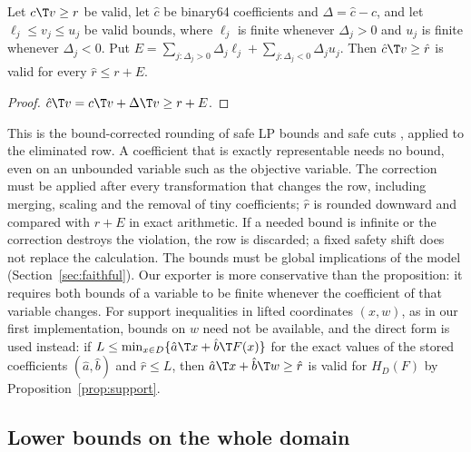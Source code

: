 \begin{proposition}\label{prop:export}
Let $c\T v\ge r$ be valid, let $\hat c$ be binary64 coefficients and
$\Delta=\hat c-c$, and let $\ell_j\le v_j\le u_j$ be valid bounds, where
$\ell_j$ is finite whenever $\Delta_j>0$ and $u_j$ is finite whenever
$\Delta_j<0$. Put
$E=\sum_{j:\Delta_j>0}\Delta_j\ell_j+\sum_{j:\Delta_j<0}\Delta_ju_j$. Then
$\hat c\T v\ge\hat r$ is valid for every $\hat r\le r+E$.
\end{proposition}

\begin{proof}
$\hat c\T v=c\T v+\Delta\T v\ge r+E$.
\end{proof}

This is the bound-corrected rounding of safe LP bounds and safe cuts
\citep{NeumaierShcherbina2004,CookEtAl2009SafeCuts,EiflerGleixner2024},
applied to the eliminated row. A coefficient that is exactly representable
needs no bound, even on an unbounded variable such as the objective variable.
The correction must be applied after every transformation that changes the
row, including merging, scaling and the removal of tiny coefficients; $\hat r$
is rounded downward and compared with $r+E$ in exact arithmetic. If a needed
bound is infinite or the correction destroys the violation, the row is
discarded; a fixed safety shift does not replace the calculation. The bounds
must be global implications of the model (Section~\ref{sec:faithful}). Our
exporter is more conservative than the proposition: it requires both bounds
of a variable to be finite whenever the coefficient of that variable changes.
For support inequalities in lifted coordinates $(x,w)$, as in our first
implementation, bounds on $w$ need not be available, and the direct form is
used instead: if $L\le\min_{x\in D}\{\hat a\T x+\hat b\T F(x)\}$ for the exact
values of the stored coefficients $(\hat a,\hat b)$ and $\hat r\le L$, then
$\hat a\T x+\hat b\T w\ge\hat r$ is valid for $H_D(F)$ by
Proposition~\ref{prop:support}.

\subsection{Lower bounds on the whole domain}\label{sec:bounds}

